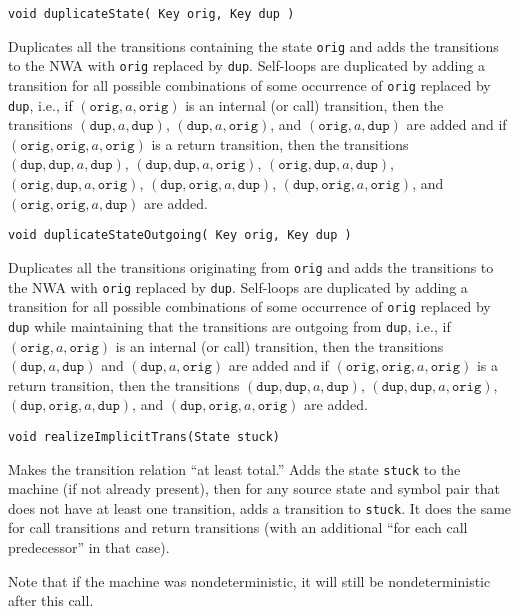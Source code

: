 \begin{description}
  \item\texttt{void duplicateState( Key orig, Key dup )} \nopagebreak

    Duplicates all the transitions containing the state \texttt{orig} and
    adds the transitions to the NWA with \texttt{orig} replaced by
    \texttt{dup}.  Self-loops are duplicated by adding a transition for all
    possible combinations of some occurrence of \texttt{orig} replaced by
    \texttt{dup}, i.e., if $(\texttt{orig},a,\texttt{orig})$ is an internal
    (or call) transition, then the transitions
    $(\texttt{dup},a,\texttt{dup})$, $(\texttt{dup},a,\texttt{orig})$, and
    $(\texttt{orig},a,\texttt{dup})$ are added and if
    $(\texttt{orig},\texttt{orig},a,\texttt{orig})$ is a return transition,
    then the transitions $(\texttt{dup},\texttt{dup},a,\texttt{dup})$,
    $(\texttt{dup},\texttt{dup},a,\texttt{orig})$,
    $(\texttt{orig},\texttt{dup},a,\texttt{dup})$,
    $(\texttt{orig},\texttt{dup},a,\texttt{orig})$,
    $(\texttt{dup},\texttt{orig},a,\texttt{dup})$,
    $(\texttt{dup},\texttt{orig},a,\texttt{orig})$, and
    $(\texttt{orig},\texttt{orig},a,\texttt{dup})$ are added.

  \item\texttt{void duplicateStateOutgoing( Key orig, Key dup )} \nopagebreak

    Duplicates all the transitions originating from \texttt{orig} and adds
    the transitions to the NWA with \texttt{orig} replaced by \texttt{dup}.
    Self-loops are duplicated by adding a transition for all possible
    combinations of some occurrence of \texttt{orig} replaced by \texttt{dup}
    while maintaining that the transitions are outgoing from \texttt{dup},
    i.e., if $(\texttt{orig},a,\texttt{orig})$ is an internal (or call)
    transition, then the transitions $(\texttt{dup},a,\texttt{dup})$ and
    $(\texttt{dup},a,\texttt{orig})$ are added and if
    $(\texttt{orig},\texttt{orig},a,\texttt{orig})$ is a return transition,
    then the transitions $(\texttt{dup},\texttt{dup},a,\texttt{dup})$,
    $(\texttt{dup},\texttt{dup},a,\texttt{orig})$,
    $(\texttt{dup},\texttt{orig},a,\texttt{dup})$, and
    $(\texttt{dup},\texttt{orig},a,\texttt{orig})$ are added.

  \item\texttt{void realizeImplicitTrans(State stuck)} \nopagebreak

    Makes the transition relation ``at least total.''
    Adds the state \texttt{stuck} to the machine (if not already present),
    then for any source state and symbol pair that does not have at least one
    transition, adds a transition to \texttt{stuck}. It does the same for
    call transitions and return transitions (with an additional ``for each
    call predecessor'' in that case).

    Note that if the machine was nondeterministic, it will still be
    nondeterministic after this call.

\end{description}
